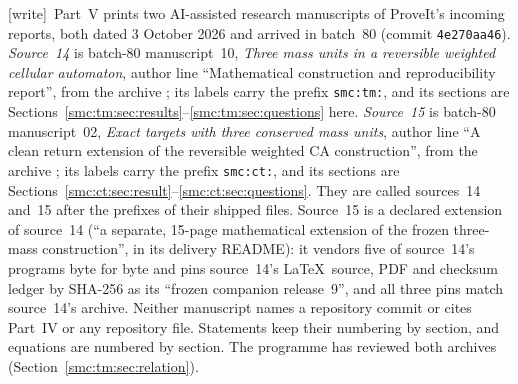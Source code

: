 \documentclass[11pt,letterpaper]{article}
\numberwithin{equation}{section}
\theoremstyle{definition}
\theoremstyle{remark}
\newcommand{\wtag}{\textup{[write]}}
\begin{document}
\noindent\wtag\ Part~V prints two AI-assisted research manuscripts of ProveIt's incoming reports, both dated 3 October 2026 and arrived in batch~80 (commit \texttt{4e270aa46}). \emph{Source~14} is batch-80 manuscript~10, \emph{Three mass units in a reversible weighted cellular automaton}, author line ``Mathematical construction and reproducibility report'', from the archive ; its labels carry the prefix \texttt{smc:tm:}, and its sections are Sections~\ref{smc:tm:sec:results}--\ref{smc:tm:sec:questions} here. \emph{Source~15} is batch-80 manuscript~02, \emph{Exact targets with three conserved mass units}, author line ``A clean return extension of the reversible weighted CA construction'', from the archive ; its labels carry the prefix \texttt{smc:ct:}, and its sections are Sections~\ref{smc:ct:sec:result}--\ref{smc:ct:sec:questions}. They are called sources~14 and~15 after the prefixes of their shipped files. Source~15 is a declared extension of source~14 (``a separate, 15-page mathematical extension of the frozen three-mass construction'', in its delivery README): it vendors five of source~14's programs byte for byte and pins source~14's \LaTeX\ source, PDF and checksum ledger by SHA-256 as its ``frozen companion release~9'', and all three pins match source~14's archive. Neither manuscript names a repository commit or cites Part~IV or any repository file. Statements keep their numbering by section, and equations are numbered by section. The programme has reviewed both archives~\cite{reviewthreemass} (Section~\ref{smc:tm:sec:relation}).
\end{document}

